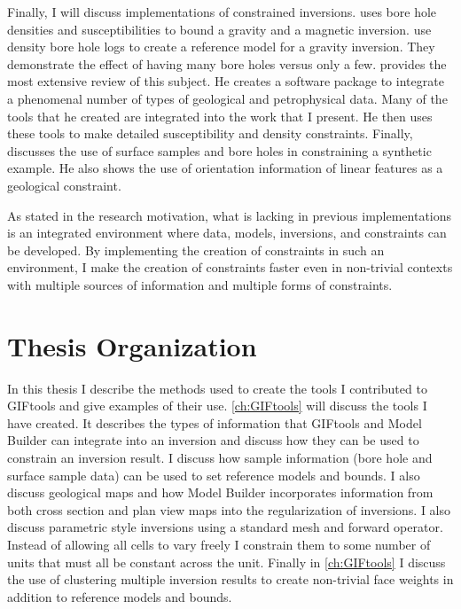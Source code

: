 Finally, I will discuss implementations of constrained inversions. \cite{phillips2001thesis} uses bore hole densities and susceptibilities to bound a gravity and a magnetic inversion. \cite{farquharson2008geologically} use density bore hole logs to create a reference model for a gravity inversion. They demonstrate the effect of having many bore holes versus only a few. \cite{williams2008geologically}  provides the most extensive review of this subject. He creates a software package to integrate a phenomenal number of types of geological and petrophysical data. Many of the tools that he created are integrated into the work that I present. He then uses these tools to make detailed susceptibility and density constraints. Finally, \cite{Lelievre2009Integrating} discusses the use of surface samples and bore holes in constraining a synthetic example. He also shows the use of orientation information of linear features as a geological constraint. 

As stated in the research motivation, what is lacking in previous implementations is an integrated environment where data, models, inversions, and constraints can be developed. By implementing the creation of constraints in such an environment, I make the creation of constraints faster even in non-trivial contexts with multiple sources of information and multiple forms of constraints.

\section{Thesis Organization}
\label{sec:Thesis Organization}
		
In this thesis I describe the methods used to create the tools I contributed to GIFtools and give examples of their use. \autoref{ch:GIFtools} will discuss the tools I have created. It  describes the types of information that GIFtools and Model Builder can integrate into an inversion and discuss how they can be used to constrain an inversion result. I discuss how sample information (bore hole and surface sample data) can be used to set reference models and bounds. I also discuss geological maps and how Model Builder incorporates information from both cross section and plan view maps into the regularization of inversions. I also discuss parametric style inversions using a standard mesh and forward operator. Instead of allowing all cells to vary freely I constrain them to some number of units that must all be constant across the unit. Finally in \autoref{ch:GIFtools}  I discuss the use of clustering multiple inversion results to create non-trivial face weights in addition to reference models and bounds.

